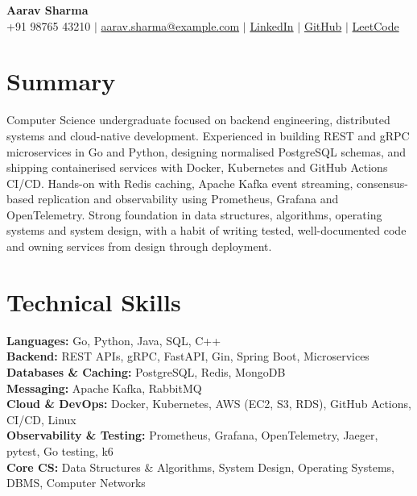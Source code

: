 \documentclass[10pt,a4paper]{article}
\begin{document}
\color{darktext}

\begin{center}
    {\Huge \textbf{Aarav Sharma}} \\[4pt]
    \small
    +91 98765 43210 \quad $\vert$ \quad \href{mailto:aarav.sharma@example.com}{aarav.sharma@example.com} \quad $\vert$ \quad
    \href{https://linkedin.com/in/example}{LinkedIn} \quad $\vert$ \quad
    \href{https://github.com/example}{GitHub} \quad $\vert$ \quad
    \href{https://leetcode.com/example}{LeetCode}
\end{center}

\section*{Summary}
Computer Science undergraduate focused on backend engineering, distributed systems and cloud-native development. Experienced in building REST and gRPC microservices in Go and Python, designing normalised PostgreSQL schemas, and shipping containerised services with Docker, Kubernetes and GitHub Actions CI/CD. Hands-on with Redis caching, Apache Kafka event streaming, consensus-based replication and observability using Prometheus, Grafana and OpenTelemetry. Strong foundation in data structures, algorithms, operating systems and system design, with a habit of writing tested, well-documented code and owning services from design through deployment.

\section*{Technical Skills}
\textbf{Languages:} Go, Python, Java, SQL, C++ \\
\textbf{Backend:} REST APIs, gRPC, FastAPI, Gin, Spring Boot, Microservices \\
\textbf{Databases \& Caching:} PostgreSQL, Redis, MongoDB \\
\textbf{Messaging:} Apache Kafka, RabbitMQ \\
\textbf{Cloud \& DevOps:} Docker, Kubernetes, AWS (EC2, S3, RDS), GitHub Actions, CI/CD, Linux \\
\textbf{Observability \& Testing:} Prometheus, Grafana, OpenTelemetry, Jaeger, pytest, Go testing, k6 \\
\textbf{Core CS:} Data Structures \& Algorithms, System Design, Operating Systems, DBMS, Computer Networks
\end{document}
